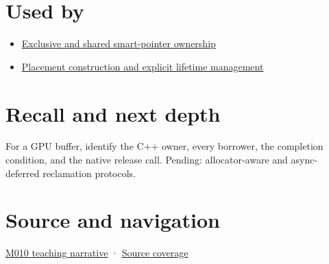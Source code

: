 \section{Used by}\label{appendix-69739d3ab49b-used-by}

\begin{itemize}
\tightlist
\item
  \hyperref[appendix-51602cabe815]{Exclusive and shared smart-pointer ownership}
\item
  \hyperref[appendix-f56c3e43fd4e]{Placement construction and explicit lifetime management}
\end{itemize}

\section{Recall and next depth}\label{appendix-69739d3ab49b-recall-and-next-depth}

For a GPU buffer, identify the C++ owner, every borrower, the completion condition, and the native release call. Pending: allocator-aware and async-deferred reclamation protocols.

\section{Source and navigation}\label{appendix-69739d3ab49b-source-and-navigation}

\href{Continuous\%20Notes/Computing\%20Foundations\%20-\%20From\%20Bits\%20to\%20C++\%20and\%20Systems\%20APIs\#From\%20a\%20live\%20object\%20to\%20responsible\%20resource\%20ownership}{M010 teaching narrative} · \hyperref[appendix-fd090d982a15-m010---parts-148-160]{Source coverage}
